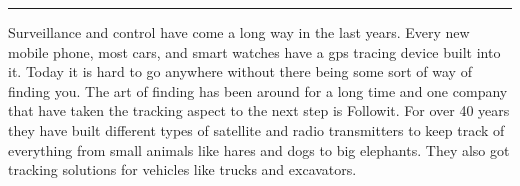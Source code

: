 
\vspace{-10ex}%
\rule{\textwidth}{0.3pt}
\vspace{5ex}


Surveillance and control have come a long way in the last years. Every new mobile phone, most cars, and smart watches have a \gls{gps} tracing device built into it. Today it is hard to go anywhere without there being some sort of way of finding you. The art of finding has been around for a long time and one company that have taken the tracking aspect to the next step is Followit. For over 40 years they have built different types of satellite and radio transmitters to keep track of everything from small animals like hares and dogs to big elephants. They also got tracking solutions for vehicles like trucks and excavators. 


